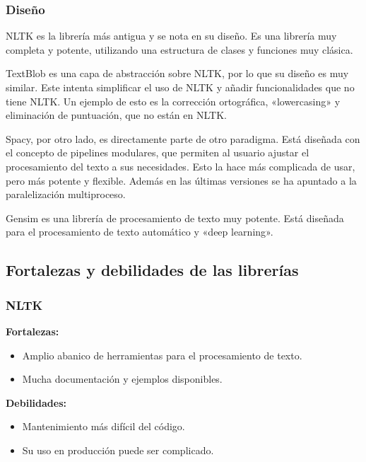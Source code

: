 \documentclass[a4paper,twocolumn]{article}
\begin{document}
    \subsubsection{Diseño}\label{subsubsec:diseno}
    NLTK es la librería más antigua y se nota en su diseño.
    Es una librería muy completa y potente, utilizando una estructura de clases y funciones muy clásica.

    TextBlob es una capa de abstracción sobre NLTK, por lo que su diseño es muy similar.
    Este intenta simplificar el uso de NLTK y añadir funcionalidades que no tiene NLTK.
    Un ejemplo de esto es la corrección ortográfica, «lowercasing» y eliminación de puntuación, que no están en NLTK.

    Spacy, por otro lado, es directamente parte de otro paradigma.
    Está diseñada con el concepto de pipelines modulares, que permiten al usuario ajustar el procesamiento del texto a sus necesidades.
    Esto la hace más complicada de usar, pero más potente y flexible.
    Además en las últimas versiones se ha apuntado a la paralelización multiproceso.

    Gensim es una librería de procesamiento de texto muy potente.
    Está diseñada para el procesamiento de texto automático y «deep learning».

    \subsection{Fortalezas y debilidades de las librerías}\label{subsec:fortalezas-y-debilidades-de-las-librerias}

    \subsubsection{NLTK}\label{subsubsec:nltk}

    \textbf{Fortalezas:}
    \begin{itemize}
        \item Amplio abanico de herramientas para el procesamiento de texto.
        \item Mucha documentación y ejemplos disponibles.
    \end{itemize}

    \textbf{Debilidades:}
    \begin{itemize}
        \item Mantenimiento más difícil del código.
        \item Su uso en producción puede ser complicado.
    \end{itemize}
\end{document}
